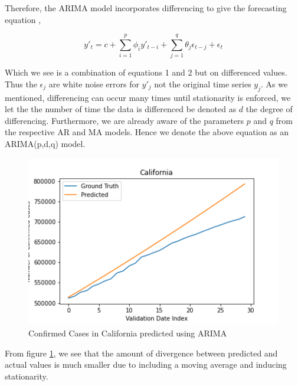 \documentclass[sigconf,nonacm]{acmart}
\begin{document}
Therefore, the ARIMA model incorporates differencing to give the forecasting
equation \cite{forecasting},

\begin{equation}
y'_t = c + \sum_{i = 1}^{p} \phi_i y'_{t-i} 
+ \sum_{j=1}^{q} \theta_j \epsilon_{t-j} + \epsilon_t
\end{equation}

Which we see is a combination of equations 1 and 2 but on differenced values.
Thus the $\epsilon_j$ are white noise errors for $y'_j$ not the original time
series $y_j$. As we mentioned, differencing can occur many times until
stationarity is enforced, we let the the number of time the data is differenced
be denoted as $d$ the degree of differencing. Furthermore, we are already aware
of the parameters $p$ and $q$ from the respective AR and MA models. Hence we
denote the above equation as an ARIMA(p,d,q) model. 

\begin{figure}
  \centering
  \includegraphics[width=\linewidth]{figures/Section2_ARIMA_Cali_Conf.png}
  \caption{Confirmed Cases in California predicted using ARIMA}
  \label{fig:ARIMA}
\end{figure}

From figure \ref{fig:ARIMA}, we see that the amount of divergence between
predicted and actual values is much smaller due to including a moving average
and inducing stationarity.
\end{document}
